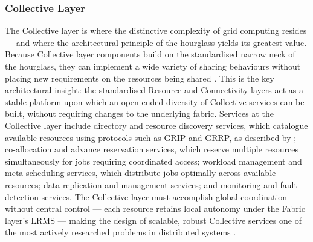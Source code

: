 \documentclass[12pt,a4paper]{report}
\begin{document}
    \subsubsection{Collective Layer}
        The Collective layer is where the distinctive complexity of grid computing resides — and where the architectural principle of the 
        hourglass yields its greatest value. Because Collective layer components build on the standardised narrow neck of the hourglass, 
        they can implement a wide variety of sharing behaviours without placing new requirements on the resources being shared \parencite{foster2001}. 
        This is the key architectural insight: the standardised Resource and Connectivity layers act as a stable platform upon which an open-ended 
        diversity of Collective services can be built, without requiring changes to the underlying fabric. Services at the Collective layer include
         directory and resource discovery services, which catalogue available resources using protocols such as GRIP and GRRP, as described 
        by \textcite{czajkowski2001}; co-allocation and advance reservation services, which reserve multiple resources simultaneously for 
        jobs requiring coordinated access; workload management and meta-scheduling services, which distribute jobs optimally across available resources;
         data replication and management services; and monitoring and fault detection services. The Collective layer must accomplish global coordination 
         without central control — each resource retains local autonomy under the Fabric layer’s LRMS — making the design of scalable, robust Collective 
         services one of the most actively researched problems in distributed systems \parencite{grigoryeva2024}.
\end{document}
